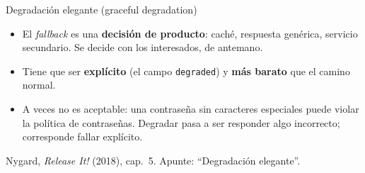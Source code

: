 \documentclass[institutional,screen,none]{ua-engineering-v6-beamer}
\begin{document}
\begin{frame}{Degradación elegante (graceful degradation)}
\begin{center}
\end{center}

\begin{itemize}\small
\item El \emph{fallback} es una \textbf{decisión de producto}: caché, respuesta genérica, servicio secundario. Se decide con los interesados, de antemano.
\item Tiene que ser \textbf{explícito} (el campo \texttt{degraded}) y \textbf{más barato} que el camino normal.
\item A veces no es aceptable: una contraseña sin caracteres especiales puede violar la política de contraseñas. Degradar pasa a ser responder algo incorrecto; corresponde fallar explícito.
\end{itemize}

{\scriptsize\color{UAIngMuted}Nygard, \emph{Release It!} (2018), cap.~5. Apunte: ``Degradación elegante''.}
\end{frame}
\end{document}
